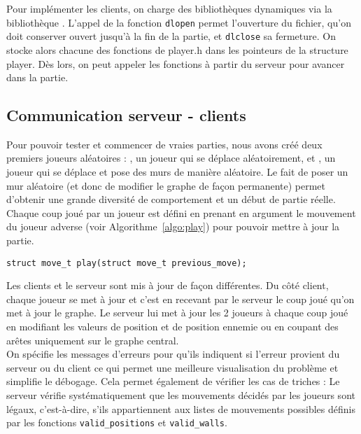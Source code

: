 \documentclass[a4paper]{article}
\begin{document}
Pour implémenter les clients, on charge des bibliothèques dynamiques via la bibliothèque . L'appel de la fonction \texttt{dlopen} permet l'ouverture du fichier, qu'on doit conserver ouvert jusqu'à la fin de la partie, et \texttt{dlclose} sa fermeture. On stocke alors chacune des fonctions de player.h dans les pointeurs de la structure player. Dès lors, on peut appeler les fonctions à partir du serveur pour avancer dans la partie. \\

\subsection{Communication serveur - clients}

Pour pouvoir tester et commencer de vraies parties, nous avons créé deux premiers joueurs aléatoires : , un joueur qui se déplace aléatoirement, et , un joueur qui se déplace et pose des murs de manière aléatoire. Le fait de poser un mur aléatoire (et donc de modifier le graphe de façon permanente) permet d'obtenir une grande diversité de comportement et un début de partie réelle. Chaque coup joué par un joueur est défini en prenant en argument le mouvement du joueur adverse (voir Algorithme~\ref{algo:play}) pour pouvoir mettre à jour la partie. \\
\begin{lstlisting}[caption = {Prototype de la fonction \texttt{play}}, label = {algo:play}, float = h]
struct move_t play(struct move_t previous_move); 
\end{lstlisting}

Les clients et le serveur sont mis à jour de façon différentes. Du côté client, chaque joueur se met à jour et c'est en recevant par le serveur le coup joué qu'on met à jour le graphe. Le serveur lui met à jour les 2 joueurs à chaque coup joué en modifiant les valeurs de position et de position ennemie ou en coupant des arêtes uniquement sur le graphe central. \\

On spécifie les messages d'erreurs pour qu'ils indiquent si l'erreur provient du serveur ou du client ce qui permet une meilleure visualisation du problème et simplifie le débogage. Cela permet également de vérifier les cas de triches :
Le serveur vérifie systématiquement que les mouvements décidés par les joueurs sont légaux, c'est-à-dire, s'ils appartiennent aux listes de mouvements possibles définis par les fonctions \texttt{valid\_positions} et \texttt{valid\_walls}.
\end{document}
